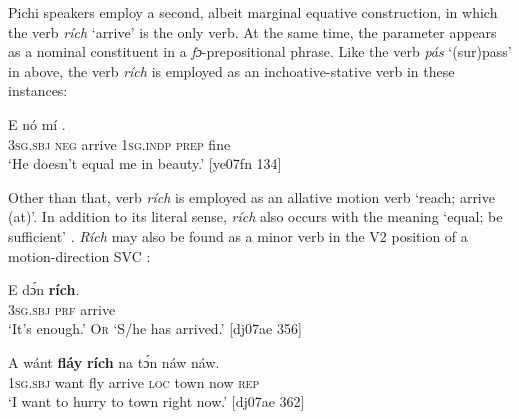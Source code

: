 Pichi speakers employ a second, albeit marginal equative construction, in which the verb \textit{rích} ‘arrive’ is the only verb. At the same time, the parameter appears as a nominal constituent in a \textit{fɔ}{}-prepositional phrase. Like the verb \textit{pás} ‘(sur)pass’ in  above, the verb \textit{rích} is employed as an inchoative-stative verb in these instances: 


\ea%
    \label{ex:key:510}
    \gll E    nó      mí      .\\
\textsc{3sg.sbj}  \textsc{neg}  arrive  \textsc{1sg.indp}  \textsc{prep}  fine\\

\glt ‘He doesn’t equal me in beauty.’ [ye07fn 134]
\z

Other than that, verb \textit{rích} is employed as an allative motion verb ‘reach; arrive (at)’. In addition to its literal sense, \textit{rích} also occurs with the meaning ‘equal; be sufficient’ . \textit{Rích} may also be found as a minor verb in the V2 position of a motion-direction SVC : 


\ea%
    \label{ex:key:511}
    \gll E    dɔ́n  \textbf{rích}.\\
\textsc{3sg.sbj}  \textsc{prf}  arrive\\

\glt ‘It’s enough.’ \textsc{Or} ‘S/he has arrived.’ [dj07ae 356]
\z


\ea%
    \label{ex:key:512}
    \gll A    wánt  \textbf{fláy}  \textbf{rích}    na  tɔ́n    náw  náw.\\
\textsc{1sg.sbj}  want  fly  arrive  \textsc{loc}  town  now  \textsc{rep}\\

\glt ‘I want to hurry to town right now.’ [dj07ae 362]
\z

